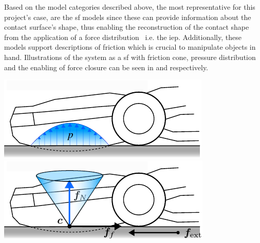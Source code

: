 Based on the model categories described above, the most representative for this project's case, are the \gls{sf} models since these can provide information about the contact surface's shape, thus enabling the reconstruction of the contact shape from the application of a force distribution~\cite{contact-mechanics} i.e. the \gls{iep}. Additionally, these models support descriptions of friction which is crucial to manipulate objects in hand. Illustrations of the system as a \gls{sf} with friction cone, pressure distribution and the enabling of force closure can be seen in  and  respectively.
%
\begin{center}
    \renewcommand{\arraystretch}{1.2}
    \begin{minipage}{.48\linewidth}
        \vspace{0pt}
        \centering
        \includegraphics[width=.95\textwidth]{chapters/modeling/fig/contact-surface.pdf}%
        \vspace{0.6cm}
        \includegraphics[width=.95\textwidth]{chapters/modeling/fig/friction-cone-schematic.pdf}%
    \end{minipage}%
    \hfill%
    \begin{minipage}{.48\linewidth}
        \vspace{0pt}
        \centering

\end{minipage}
\end{center}
